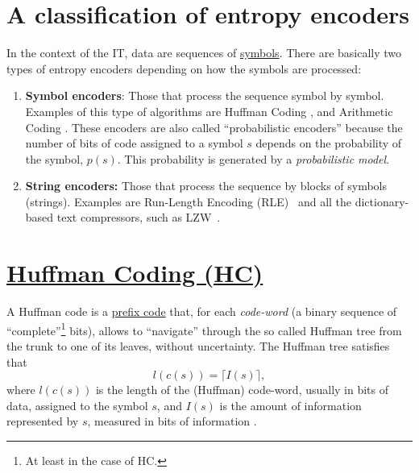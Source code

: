 \section{A classification of entropy encoders}
In the context of the IT, data are sequences of
\href{https://en.wikipedia.org/wiki/Symbol}{symbols}. There are
basically two types of entropy encoders depending on how the symbols
are processed:

\begin{enumerate}
\item \textbf{Symbol encoders}: Those that process the sequence symbol
  by symbol. Examples of this type of algorithms are Huffman
  Coding \cite{vruiz__huffman_coding}, and Arithmetic
  Coding \cite{vruiz__arithmetic_coding}. These encoders are also
  called ``probabilistic encoders'' because the number of bits of code
  assigned to a symbol $s$ depends on the probability of the symbol,
  $p(s)$. This probability is generated by a \emph{probabilistic
    model}.
\item \textbf{String encoders:} Those that process the sequence by
  blocks of symbols (strings). Examples are Run-Length Encoding
  (RLE)~\cite{vruiz__rle} and all the dictionary-based text
  compressors, such as LZW~\cite{vruiz__LZW}.
\end{enumerate}

\section{\href{https://en.wikipedia.org/wiki/Huffman_coding}{Huffman Coding (HC)}}
A Huffman
code \cite{vruiz__huffman_coding,ruiz2000compresion,nelson96datacompression}
is a \href{https://en.wikipedia.org/wiki/Prefix_code}{prefix code}
that, for each \emph{code-word} (a binary sequence of
``complete''\footnote{At least in the case of HC.} bits), allows to
``navigate'' through the so called Huffman tree from the trunk to one
of its leaves, without uncertainty. The Huffman tree satisfies that
\begin{equation}
  l(c(s)) = \lceil I(s)\rceil,
  \label{eq:huffman_performance}
\end{equation}
where $l(c(s))$ is the length of the (Huffman) code-word, usually in
bits of data, assigned to the symbol $s$, and $I(s)$ is the amount of
information represented by $s$, measured in bits of
information \cite{vruiz__information_theory}.

